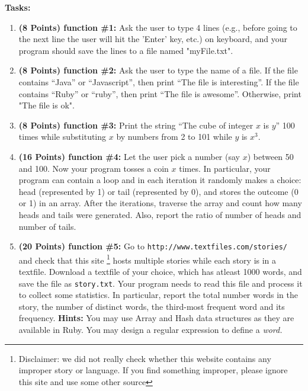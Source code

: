 \documentclass[paper=letter, fontsize=11pt]{scrartcl} %
\begin{document}
    \textbf{Tasks:}
    \begin{enumerate}[noitemsep]

        \item \textbf{(8 Points) function \#1:} Ask the user to type 4 lines (e.g., before going to the next line the user will hit the 'Enter' key, etc.) on keyboard, and your program should save the lines to a file named "myFile.txt".
        \item \textbf{(8 Points) function \#2:} Ask the user to type the name of a file. If the file contains ``Java'' or ``Javascript'', then print ``The file is interesting''. If the file contains ``Ruby'' or ``ruby'', then print ``The file is awesome''. Otherwise, print "The file is ok". 
        \item \textbf{(8 Points) function \#3:} Print the string ``The cube of integer $x$ is $y$'' 100 times while substituting $x$ by numbers from 2 to 101 while $y$ is $x^3$.
        \item \textbf{(16 Points) function \#4:} Let the user pick a number (say $x$) between 50 and 100. Now your program tosses a coin $x$ times. 
In particular, your program can contain a loop and in each iteration it randomly makes a choice: head (represented by 1) or 
tail (represented by 0), and stores the outcome (0 or 1) 
in an array. After the iterations, traverse the array and count how many heads and tails were generated. 
Also, report the ratio of number of heads and number of tails.

        \item \textbf{(20 Points) function \#5:} Go to \texttt{http://www.textfiles.com/stories/} and check that this site \footnote {Disclaimer: we did not really check whether this website contains any improper story or language. If you find something improper, please ignore this site and use some other source} hosts multiple stories while each story is in a textfile. Download a textfile of your choice, which has atleast 1000 words, and save the file as \texttt{story.txt}. Your program needs to read this file and process it to collect some statistics. In particular, report the total number words in the story, the number of distinct words, the third-most frequent word and its frequency. \textbf {Hints:} You may use Array and Hash data structures as they are available in Ruby. You may design a regular expression to define a \em{word}.  

    \end{enumerate}
 
\end{document}
